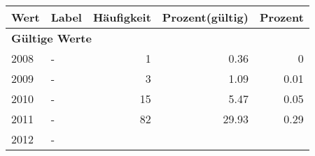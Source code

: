      \begin{longtable}{lXrrr}
     \toprule
     \textbf{Wert} & \textbf{Label} & \textbf{Häufigkeit} & \textbf{Prozent(gültig)} & \textbf{Prozent} \\
     \endhead
     \midrule
     \multicolumn{5}{l}{\textbf{Gültige Werte}}\\

     2008 &
     \multicolumn{1}{X}{ -  } &


       \num{1} &
       \num[round-mode=places,round-precision=2]{0.36} &
         \num[round-mode=places,round-precision=2]{0} \\

     2009 &
     \multicolumn{1}{X}{ -  } &


       \num{3} &
       \num[round-mode=places,round-precision=2]{1.09} &
         \num[round-mode=places,round-precision=2]{0.01} \\

     2010 &
     \multicolumn{1}{X}{ -  } &


       \num{15} &
       \num[round-mode=places,round-precision=2]{5.47} &
         \num[round-mode=places,round-precision=2]{0.05} \\

     2011 &
     \multicolumn{1}{X}{ -  } &


       \num{82} &
       \num[round-mode=places,round-precision=2]{29.93} &
         \num[round-mode=places,round-precision=2]{0.29} \\

     2012 &
     \multicolumn{1}{X}{ -  } &



\end{longtable}
